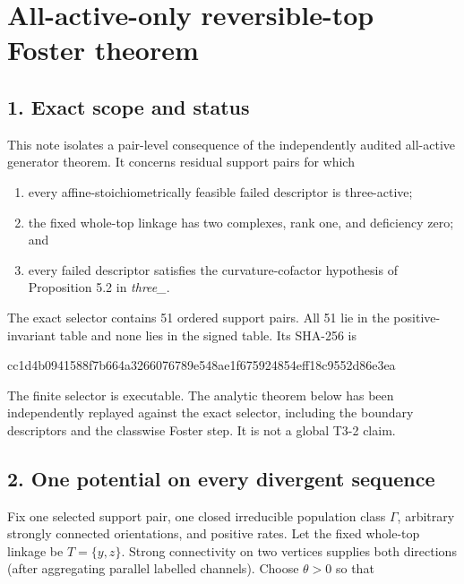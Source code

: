 \section{All-active-only reversible-top Foster
theorem}

\subsection{1. Exact scope and status}

This note isolates a pair-level consequence of the independently audited
all-active generator theorem. It concerns residual support pairs for
which

\begin{enumerate}
\def\labelenumi{\arabic{enumi}.}
\tightlist
\item
  every affine-stoichiometrically feasible failed descriptor is
  three-active;
\item
  the fixed whole-top linkage has two complexes, rank one, and
  deficiency zero; and
\item
  every failed descriptor satisfies the curvature-cofactor hypothesis of
  Proposition 5.2 in \emph{three\_\texttt{}}.
\end{enumerate}

The exact selector contains 51 ordered support pairs. All 51 lie in the
positive-invariant table and none lies in the signed table. Its SHA-256
is

\begin{CodeBlock}
cc1d4b0941588f7b664a3266076789e548ae1f675924854eff18c9552d86e3ea
\end{CodeBlock}

The finite selector is executable. The analytic theorem below has been
independently replayed against the exact selector, including the
boundary descriptors and the classwise Foster step. It is not a global
T3-2 claim.

\subsection{2. One potential on every divergent
sequence}

Fix one selected support pair, one closed irreducible population class
\(\Gamma\), arbitrary strongly connected orientations, and positive
rates. Let the fixed whole-top linkage be \(T=\{y,z\}\). Strong
connectivity on two vertices supplies both directions (after aggregating
parallel labelled channels). Choose \(\theta>0\) so that

